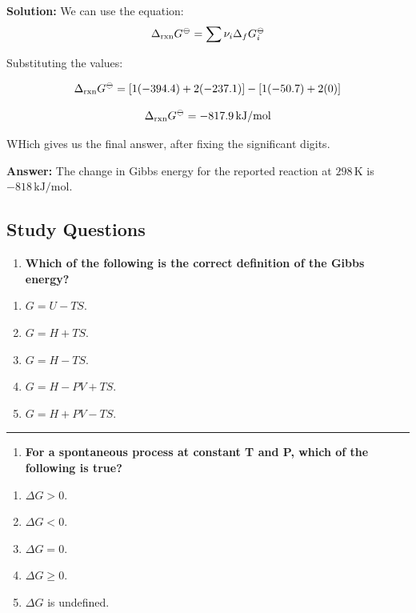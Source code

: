 \documentclass[
  9pt,
]{extbook}
\providecommand{\tightlist}{%
  \setlength{\itemsep}{0pt}\setlength{\parskip}{0pt}}
\theoremstyle{definition}
\theoremstyle{definition}
\theoremstyle{definition}
\theoremstyle{definition}
\theoremstyle{remark}
\begin{document}
\textbf{Solution:} We can use the equation: \[\Delta_{\text{rxn}}G^{{-\kern-6pt{\ominus}\kern-6pt-}} = \sum \nu_i \Delta_f G^{{-\kern-6pt{\ominus}\kern-6pt-}}_i \]

Substituting the values:

\[\Delta_{\text{rxn}}G^{{-\kern-6pt{\ominus}\kern-6pt-}} = [1(-394.4) + 2(-237.1)] - [1(-50.7) + 2(0)]\]

\[\Delta_{\text{rxn}}G^{{-\kern-6pt{\ominus}\kern-6pt-}} = -817.9\,\text{kJ/mol}\]

WHich gives us the final answer, after fixing the significant digits.

\textbf{Answer:} The change in Gibbs energy for the reported reaction at \(298\,\text{K}\) is \(-818\,\text{kJ/mol}\).

\subsection{Study Questions}\label{quest9}

\begin{enumerate}
\def\labelenumi{\arabic{enumi}.}
\tightlist
\item
  \textbf{Which of the following is the correct definition of the Gibbs energy?}
\end{enumerate}

\begin{enumerate}
\def\labelenumi{\alph{enumi}.}
\tightlist
\item
  \(G = U - TS\).
\item
  \(G = H + TS\).
\item
  \(G = H - TS\).
\item
  \(G = H - PV + TS\).
\item
  \(G = H + PV - TS\).
\end{enumerate}

\begin{center}\rule{0.5\linewidth}{0.5pt}\end{center}

\begin{enumerate}
\def\labelenumi{\arabic{enumi}.}
\setcounter{enumi}{1}
\tightlist
\item
  \textbf{For a spontaneous process at constant T and P, which of the following is true?}
\end{enumerate}

\begin{enumerate}
\def\labelenumi{\alph{enumi}.}
\tightlist
\item
  \(\Delta G > 0\).
\item
  \(\Delta G < 0\).
\item
  \(\Delta G = 0\).
\item
  \(\Delta G \geq 0\).
\item
  \(\Delta G\) is undefined.
\end{enumerate}
\end{document}
